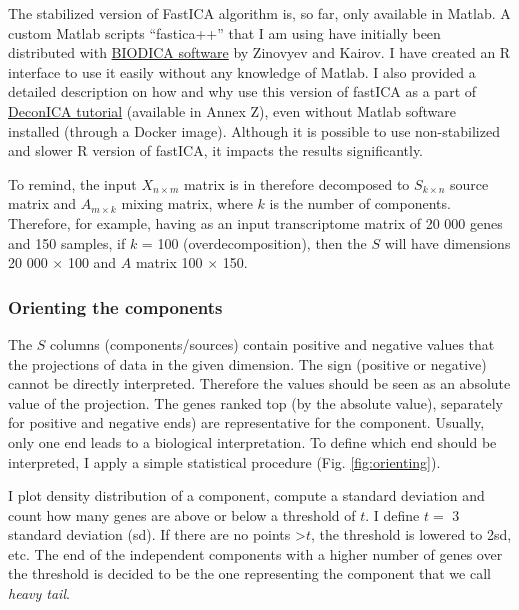 \documentclass[12pt,]{book}
\theoremstyle{definition}
\theoremstyle{definition}
\theoremstyle{definition}
\theoremstyle{remark}
\begin{document}
The stabilized version of FastICA algorithm is, so far, only available
in Matlab. A custom Matlab scripts ``fastica++'' that I am using have
initially been distributed with
\href{https://github.com/LabBandSB/BIODICA}{BIODICA software} by
Zinovyev and Kairov. I have created an R interface to use it easily
without any knowledge of Matlab. I also provided a detailed description
on how and why use this version of fastICA as a part of
\href{https://urszulaczerwinska.github.io/DeconICA/Icasso.html}{DeconICA
tutorial} (available in Annex Z), even without Matlab software installed
(through a Docker image). Although it is possible to use non-stabilized
and slower R version of fastICA, it impacts the results significantly.

To remind, the input \(X_{n\times m}\) matrix is in therefore decomposed
to \(S_{k\times n}\) source matrix and \(A_{m \times k}\) mixing matrix,
where \(k\) is the number of components. Therefore, for example, having
as an input transcriptome matrix of 20 000 genes and 150 samples, if
\(k\) = 100 (overdecomposition), then the \(S\) will have dimensions 20
000 \(\times\) 100 and \(A\) matrix 100 \(\times\) 150.

\hypertarget{orienting-the-components}{%
\subsubsection{Orienting the
components}\label{orienting-the-components}}

The \(S\) columns (components/sources) contain positive and negative
values that the projections of data in the given dimension. The sign
(positive or negative) cannot be directly interpreted. Therefore the
values should be seen as an absolute value of the projection. The genes
ranked top (by the absolute value), separately for positive and negative
ends) are representative for the component. Usually, only one end leads
to a biological interpretation. To define which end should be
interpreted, I apply a simple statistical procedure (Fig.
\ref{fig:orienting}).

I plot density distribution of a component, compute a standard deviation
and count how many genes are above or below a threshold of \(t\). I
define \(t =\) 3 standard deviation (sd). If there are no points
\textgreater{}\(t\), the threshold is lowered to 2sd, etc. The end of
the independent components with a higher number of genes over the
threshold is decided to be the one representing the component that we
call \emph{heavy tail}.
\end{document}
